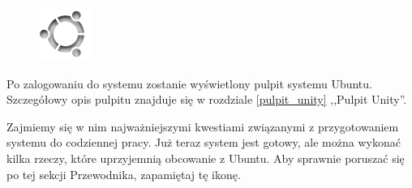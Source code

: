 \begin{figure}
	\vspace{-10pt}
	\includegraphics[width=\linewidth]{images/ikony_dash.png}
\end{figure}

Po zalogowaniu do systemu zostanie wyświetlony pulpit systemu Ubuntu. Szczegółowy opis pulpitu znajduje się w rozdziale \ref{pulpit_unity} ,,Pulpit Unity''.

Zajmiemy się w nim najważniejszymi kwestiami związanymi z przygotowaniem systemu do codziennej pracy. Już teraz system jest gotowy, ale można wykonać kilka rzeczy, które uprzyjemnią obcowanie z Ubuntu. Aby sprawnie poruszać się po tej sekcji Przewodnika, zapamiętaj tę ikonę.
